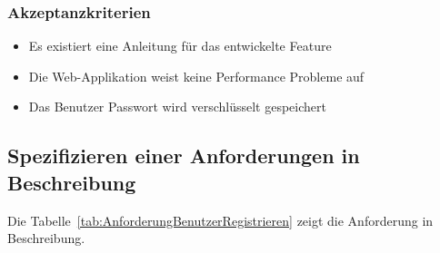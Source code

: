 \subsubsection{Akzeptanzkriterien}
\begin{itemize}
  \item Es existiert eine Anleitung für das entwickelte Feature
  \item Die Web-Applikation weist keine Performance Probleme auf
  \item Das Benutzer Passwort wird verschlüsselt gespeichert
\end{itemize}

\subsection{Spezifizieren einer Anforderungen in  Beschreibung}
Die Tabelle~\ref{tab:AnforderungBenutzerRegistrieren} zeigt die Anforderung  in  Beschreibung.
